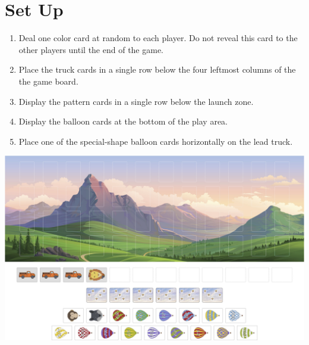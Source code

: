 \documentclass[a6paper, 11pt, parskip=half, DIV=15]{scrartcl}
\begin{document}
\newpage
\enlargethispage{1.75\baselineskip}
\section*{Set Up}
\begin{enumerate}

  \item Deal one color card at random to each player.
  Do not reveal this card to the other players until the end of the game.

 
  \item Place the truck cards in a single row below the four leftmost columns of the the game board.%

   \item Display the pattern cards in a single row below the launch zone.

  \item Display the balloon cards at the bottom of the play area. 

  \item Place one of the special-shape balloon cards horizontally on the lead truck.%
\end{enumerate}
\begin{center}
\includegraphics[scale=0.105]{set_up_diagram.jpg}
\end{center}
\end{document}
